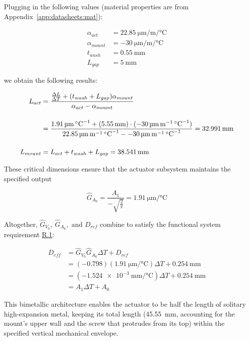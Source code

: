 \documentclass[12pt, letterpaper]{report}%
\newcounter{mycounter}           %
\newcounter{sub}[mycounter]      %
\newcommand{\specActuatorCTE}{\SI{22.85}{\micro\meter\per\meter\per\celsius}} %
\newcommand{\specMountCTE}{\SI{-30}{\micro\meter\per\meter\per\celsius}}
\newcommand{\AoneExact}{\SI{-1.524e-3}{\milli\meter\per\celsius}}
\newcommand{\AzeroExact}{\SI{0.254}{\milli\meter}}
\newcommand{\specOrigActuatorLength}{\SI{32.991}{\milli \meter}}
\newcommand{\GA}{\SI{1.91}{\micro\meter\per\celsius}}
\newcommand{\GV}{\num{-0.798}}
\newcommand{\specref}[1]{\hyperref[tab:specs]{#1}}
\begin{document}
			Plugging in the following values (material properties are from Appendix~\ref{app:datasheets:mat}):

			\begin{align*}
				\alpha_{act} &= \specActuatorCTE \\
				\alpha_{mount} &= \specMountCTE \\
				t_{wash} &= \SI{0.55}{\milli\meter} \\
				L_{gap} &= \SI{5}{\milli\meter}
			\end{align*}

			we obtain the following results:

			\begin{align}
				L_{act} &= \frac{\frac{\Delta L}{\Delta T} + (t_{wash} + L_{gap}) \alpha_{mount}}{\alpha_{act} - \alpha_{mount}} \notag \\[12pt]
				&= \frac{\GA + (\SI{5.55}{\milli\meter}) \cdot (\specMountCTE)}{\specActuatorCTE - \specMountCTE} = \specOrigActuatorLength \label{eq:L_act}\\[12pt]
				L_{mount} &= L_{act} + t_{wash} + L_{gap} = \SI{38.541}{\milli\meter} \label{eq:L_mount}
			\end{align}

			These critical dimensions ensure that the actuator subsystem maintains the specified output

			\begin{equation}
				\hat{G}_{A_0} = \frac{A_1}{-\sqrt{\frac{2}{\pi}}} = \GA
			\end{equation}

			Altogether, $\hat{G}_{V_0},\ \hat{G}_{A_0}, \text{ and } D_{ref}$ combine to satisfy the functional system requirement \specref{R.1}:
			
			\begin{equation}
				\begin{aligned}
					D_{eff} &= \hat{G}_{V_0} \hat{G}_{A_0} \Delta T + D_{ref} \\
					&= \left( \GV \right) \left( \GA \right) \Delta T + \AzeroExact \\
					&= \left( \AoneExact \right) \Delta T + \AzeroExact \\
					&= A_1 \Delta T + A_0
				\end{aligned}
			\end{equation}

				This bimetallic architecture enables the actuator to be half the length of solitary high-expansion metal, keeping its total length (\SI{45.55}{\milli\meter}, accounting for the mount's upper wall and the screw that protrudes from its top) within the specified vertical mechanical envelope.
\end{document}
